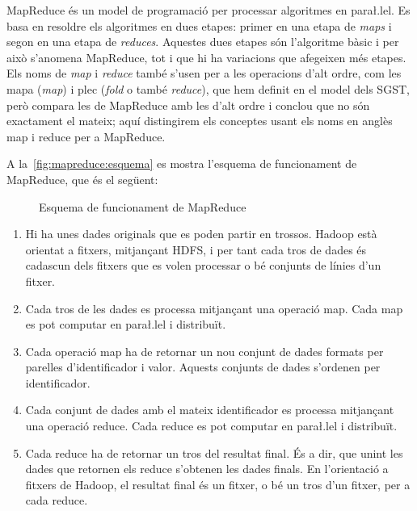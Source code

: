 MapReduce \parencite{deanghemawat04:mapreduce,lammel08:mapreduce} és
un model de programació per processar algoritmes en para\l.lel. Es
basa en resoldre els algoritmes en dues etapes: primer en una etapa de
\emph{maps} i segon en una etapa de \emph{reduces}.  Aquestes dues
etapes són l'algoritme bàsic i per això s'anomena MapReduce, tot i que
hi ha variacions que afegeixen més etapes.  Els noms de \emph{map} i
\emph{reduce} també s'usen per a les operacions d'alt ordre, com les
mapa (\emph{map}) i plec (\emph{fold} o també \emph{reduce}), que hem
definit en el model dels \gls{SGST}, però
\textcite{lammel08:mapreduce} compara les de MapReduce amb les d'alt
ordre i conclou que no són exactament el mateix; aquí distingirem els
conceptes usant els noms en anglès map i reduce per a MapReduce.


A la~\autoref{fig:mapreduce:esquema}
es mostra l'esquema de funcionament de MapReduce, que és el següent:


\begin{figure}[tp]
  \centering
  
  \caption{Esquema de funcionament de MapReduce}
  \label{fig:mapreduce:esquema}
\end{figure}



\begin{enumerate}

\item Hi ha unes dades originals que es poden partir en
  trossos. Hadoop està orientat a fitxers, mitjançant \gls{HDFS}, i
  per tant cada tros de dades és cadascun dels fitxers que es volen
  processar o bé conjunts de línies d'un fitxer.

\item Cada tros de les dades es processa mitjançant una operació
  map. Cada map es pot computar en para\l.lel i distribuït.

\item Cada operació map ha de retornar un nou conjunt de dades
  formats per parelles d'identificador i valor. Aquests conjunts de
  dades s'ordenen per identificador. 

\item Cada conjunt de dades amb el mateix identificador es processa
  mitjançant una operació reduce. Cada reduce es pot computar en
  para\l.lel i distribuït.

\item Cada reduce ha de retornar un tros del resultat final. És a dir,
  que unint les dades que retornen els reduce s'obtenen les dades
  finals. En l'orientació a fitxers de Hadoop, el resultat final és un
  fitxer, o bé un tros d'un fitxer, per a cada reduce.

\end{enumerate}



